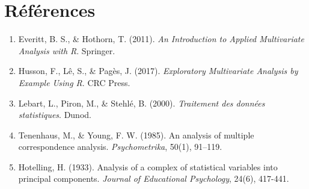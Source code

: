 \documentclass[12pt,a4paper]{report}
\begin{document}
\newpage

\section*{Références}

\begin{enumerate}
    \item Everitt, B. S., \& Hothorn, T. (2011). \textit{An Introduction to Applied Multivariate Analysis with R}. Springer.
    
    \item Husson, F., Lê, S., \& Pagès, J. (2017). \textit{Exploratory Multivariate Analysis by Example Using R}. CRC Press.
    
    \item Lebart, L., Piron, M., \& Stehlé, B. (2000). \textit{Traitement des données statistiques}. Dunod.
    
    \item Tenenhaus, M., \& Young, F. W. (1985). An analysis of multiple correspondence analysis. \textit{Psychometrika}, 50(1), 91--119.
    
    \item Hotelling, H. (1933). Analysis of a complex of statistical variables into principal components. \textit{Journal of Educational Psychology}, 24(6), 417-441.
\end{enumerate}
\end{document}
